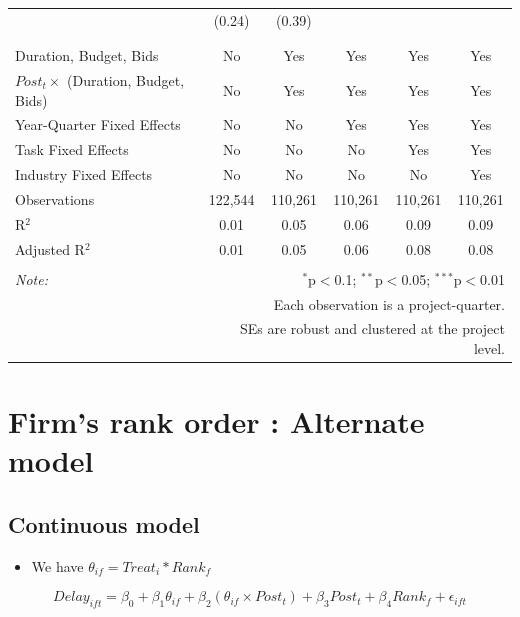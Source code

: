 \documentclass[
]{article}
\providecommand{\tightlist}{%
  \setlength{\itemsep}{0pt}\setlength{\parskip}{0pt}}
\begin{document}
\begin{table}[H]
\begin{tabular}{@{\extracolsep{-2pt}}lccccc}
  & (0.24) & (0.39) &  &  &  \\ 
  & & & & & \\ 
\hline \\[-1.8ex] 
Duration, Budget, Bids & No & Yes & Yes & Yes & Yes \\ 
$Post_t \times$  (Duration, Budget, Bids) & No & Yes & Yes & Yes & Yes \\ 
Year-Quarter Fixed Effects & No & No & Yes & Yes & Yes \\ 
Task Fixed Effects & No & No & No & Yes & Yes \\ 
Industry Fixed Effects & No & No & No & No & Yes \\ 
Observations & 122,544 & 110,261 & 110,261 & 110,261 & 110,261 \\ 
R$^{2}$ & 0.01 & 0.05 & 0.06 & 0.09 & 0.09 \\ 
Adjusted R$^{2}$ & 0.01 & 0.05 & 0.06 & 0.08 & 0.08 \\ 
\hline 
\hline \\[-1.8ex] 
\textit{Note:}  & \multicolumn{5}{r}{$^{*}$p$<$0.1; $^{**}$p$<$0.05; $^{***}$p$<$0.01} \\ 
 & \multicolumn{5}{r}{Each observation is a project-quarter.} \\ 
 & \multicolumn{5}{r}{SEs are robust and clustered at the project level.} \\ 
\end{tabular} 
\end{table}

\hypertarget{firms-rank-order-alternate-model}{%
\section{Firm's rank order : Alternate
model}\label{firms-rank-order-alternate-model}}

\hypertarget{continuous-model}{%
\subsection{Continuous model}\label{continuous-model}}

\begin{itemize}
\tightlist
\item
  We have \(\theta_{if} = Treat_i * Rank_f\)
\end{itemize}

\[ Delay_{ift} = \beta_0 + \beta_1 \theta_{if} + \beta_2 (\theta_{if} \times Post_t) + \beta_3 Post_t + \beta_4 Rank_f + \epsilon_{ift} \]
\end{document}
